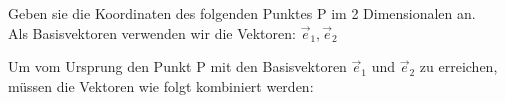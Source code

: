 \beginbsp
Geben sie die Koordinaten des folgenden Punktes P im 2 Dimensionalen an. \\ Als Basisvektoren verwenden wir die Vektoren: $ \vec{e}_1, \vec{e}_2$
\begin{center}
\end{center}
\iend
\newpage
{}
\beginbsp
Um vom Ursprung den Punkt P mit den Basisvektoren $\vec{e}_1$ und $\vec{e}_2$ zu erreichen, müssen die Vektoren wie folgt kombiniert werden:
\begin{center}
\end{center}
